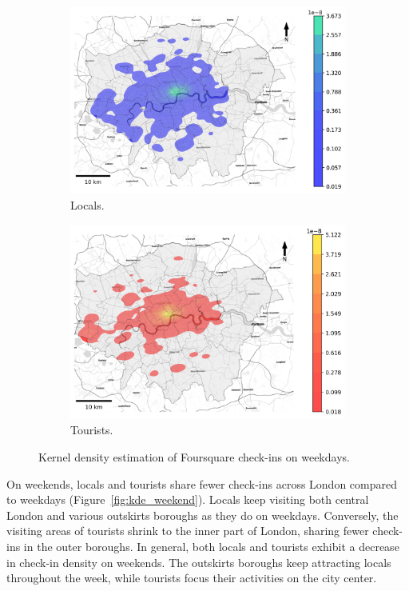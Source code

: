 \documentclass{article}
\theoremstyle{definition}
\theoremstyle{remark}
\begin{document}
\begin{figure}[!h]

\begin{subfigure}{0.5\textwidth}
\includegraphics[width=1\linewidth]{figures/kde_locals_weekday.png} 
\caption{Locals.}
\label{fig:kde_locals_weekday}
\end{subfigure}
\begin{subfigure}{0.5\textwidth}
\includegraphics[width=1\linewidth]{figures/kde_tourists_weekday.png}
\caption{Tourists.}
\label{fig:kde_tourists_weekday}
\end{subfigure}

\caption{Kernel density estimation of Foursquare check-ins on weekdays.} \label{fig:kde_weekday}
\end{figure}

On weekends, locals and tourists share fewer check-ins across London compared to weekdays (Figure~\ref{fig:kde_weekend}). Locals keep visiting both central London and various outskirts boroughs as they do on weekdays.  Conversely, the visiting areas of tourists shrink to the inner part of London, sharing fewer check-ins in the outer boroughs. In general, both locals and tourists exhibit a decrease in check-in density on weekends. The outskirts boroughs keep attracting locals throughout the week, while tourists focus their activities on the city center.
\end{document}
